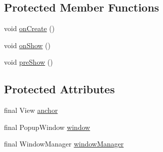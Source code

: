 \subsection*{Protected Member Functions}
\begin{DoxyCompactItemize}
\item 
void \hyperlink{classcom_1_1zia_1_1freshdocs_1_1widget_1_1quickaction_1_1_custom_popup_window_aa374ebc5c7182bf43cee0cb279f1c249}{on\-Create} ()
\item 
void \hyperlink{classcom_1_1zia_1_1freshdocs_1_1widget_1_1quickaction_1_1_custom_popup_window_ad9dd9b7cf182dd1a67f028fcce44882c}{on\-Show} ()
\item 
void \hyperlink{classcom_1_1zia_1_1freshdocs_1_1widget_1_1quickaction_1_1_custom_popup_window_af930b5aefa09efa2ccc0bf264dfea0ce}{pre\-Show} ()
\end{DoxyCompactItemize}
\subsection*{Protected Attributes}
\begin{DoxyCompactItemize}
\item 
final View \hyperlink{classcom_1_1zia_1_1freshdocs_1_1widget_1_1quickaction_1_1_custom_popup_window_a2ddc37724854869179d0c674580dce1b}{anchor}
\item 
final Popup\-Window \hyperlink{classcom_1_1zia_1_1freshdocs_1_1widget_1_1quickaction_1_1_custom_popup_window_abb4ee081dc8ab0b1f0760588753e359d}{window}
\item 
final Window\-Manager \hyperlink{classcom_1_1zia_1_1freshdocs_1_1widget_1_1quickaction_1_1_custom_popup_window_adce54e21e2caf4468cece0f5e879bfdf}{window\-Manager}
\end{DoxyCompactItemize}


